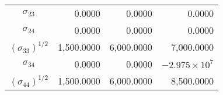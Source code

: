 \begin{center}
\begin{threeparttable}
\begin{tabular}{crrr}
  $\sigma_{23}$         &     0.0000 &     0.0000 &     0.0000 \\
  $\sigma_{24}$         &     0.0000 &     0.0000 &     0.0000 \\
  $(\sigma_{33})^{1/2}$ &  1,500.0000 &  6,000.0000 &  7,000.0000 \\
  $\sigma_{34}$         &     0.0000 &     0.0000 & $-2.975\times10^7$\\
  $(\sigma_{44})^{1/2}$ &  1,500.0000 &  6,000.0000 &  8,500.0000 \\
  \bottomrule
  \end{tabular}
\end{threeparttable}
\end{center}\vspace{0.5cm}
